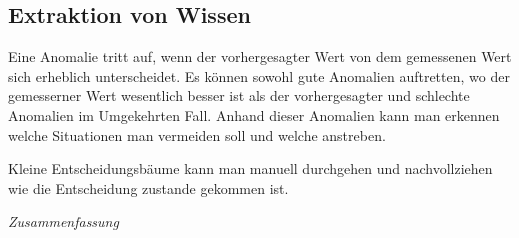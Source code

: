 \subsection{Extraktion von Wissen}
Eine Anomalie tritt auf, wenn der vorhergesagter Wert von dem gemessenen Wert sich erheblich unterscheidet.
Es können sowohl gute Anomalien auftretten, wo der gemesserner Wert wesentlich besser ist als der vorhergesagter und schlechte Anomalien im Umgekehrten Fall.
Anhand dieser Anomalien kann man erkennen welche Situationen man vermeiden soll und welche anstreben.

Kleine Entscheidungsbäume kann man manuell durchgehen und nachvollziehen wie die Entscheidung zustande gekommen ist.

\textit{Zusammenfassung}
